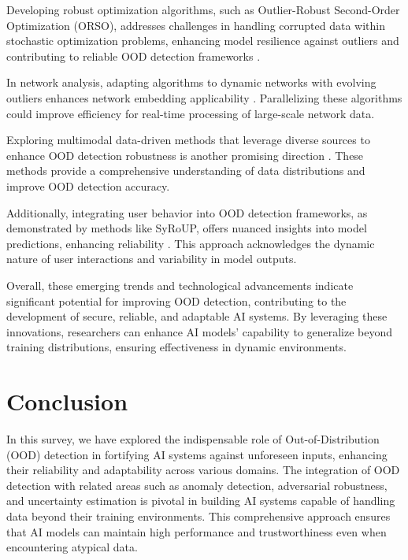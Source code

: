 Developing robust optimization algorithms, such as Outlier-Robust Second-Order Optimization (ORSO), addresses challenges in handling corrupted data within stochastic optimization problems, enhancing model resilience against outliers and contributing to reliable OOD detection frameworks \cite{li2024robustsecondordernonconvexoptimization}.

In network analysis, adapting algorithms to dynamic networks with evolving outliers enhances network embedding applicability \cite{bandyopadhyay2018outlierawarenetworkembedding}. Parallelizing these algorithms could improve efficiency for real-time processing of large-scale network data.

Exploring multimodal data-driven methods that leverage diverse sources to enhance OOD detection robustness is another promising direction \cite{lopez2023informativepriorsimprovereliability}. These methods provide a comprehensive understanding of data distributions and improve OOD detection accuracy.

Additionally, integrating user behavior into OOD detection frameworks, as demonstrated by methods like SyRoUP, offers nuanced insights into model predictions, enhancing reliability \cite{sicilia2024accountingsycophancylanguagemodel}. This approach acknowledges the dynamic nature of user interactions and variability in model outputs.

Overall, these emerging trends and technological advancements indicate significant potential for improving OOD detection, contributing to the development of secure, reliable, and adaptable AI systems. By leveraging these innovations, researchers can enhance AI models' capability to generalize beyond training distributions, ensuring effectiveness in dynamic environments.











\section{Conclusion} \label{sec:Conclusion}

In this survey, we have explored the indispensable role of Out-of-Distribution (OOD) detection in fortifying AI systems against unforeseen inputs, enhancing their reliability and adaptability across various domains. The integration of OOD detection with related areas such as anomaly detection, adversarial robustness, and uncertainty estimation is pivotal in building AI systems capable of handling data beyond their training environments. This comprehensive approach ensures that AI models can maintain high performance and trustworthiness even when encountering atypical data.

